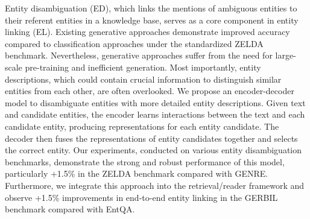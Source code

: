 Entity disambiguation (ED), which links the mentions of ambiguous entities to their referent entities in a knowledge base, serves as a core component in entity linking (EL). Existing generative approaches demonstrate improved accuracy compared to classification approaches under the standardized ZELDA benchmark. Nevertheless, generative approaches suffer from the need for large-scale pre-training and inefficient generation. Most importantly, entity descriptions, which could contain crucial information to  distinguish similar entities from each other, are often overlooked. We propose an encoder-decoder model to disambiguate entities with more detailed entity descriptions. Given text and candidate entities, the encoder learns interactions between the text and each candidate entity, producing representations for each entity candidate. The decoder then fuses the representations of entity candidates together and selects the correct entity. Our experiments, conducted on various entity disambiguation benchmarks, demonstrate the strong and robust performance of this model, particularly +1.5\% in the ZELDA benchmark compared with GENRE. Furthermore, we integrate this approach into the retrieval/reader framework and observe +1.5\% improvements in end-to-end entity linking in the GERBIL benchmark compared with EntQA.